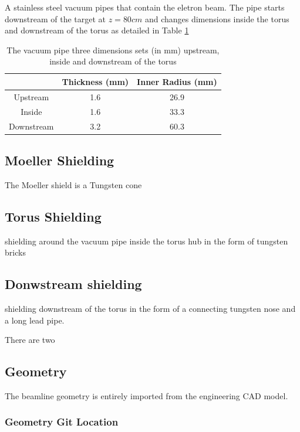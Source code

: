 A stainless steel vacuum pipes that contain the eletron beam. The pipe starts downstream of the target at $z=80cm$
and changes dimensions inside the torus and downstream of the torus as detailed in Table \ref{tab:beampipe}

\begin{table}[h]
	\begin{center}
		\begin{tabular}{| c | c | c |}
			\hline \hline
			                & Thickness (mm) & Inner Radius (mm)   \\
			\hline
              Upstream      &    1.6     &    26.9 \\
              Inside        &    1.6     &    33.3 \\
            Downstream      &    3.2     &    60.3 \\
			\hline \hline
		\end{tabular}
	\end{center}
	\caption{The vacuum pipe three dimensions sets (in mm) upstream, inside and downstream of the torus}\label{tab:beampipe}
\end{table}


\subsection{Moeller Shielding}
The Moeller shield is a Tungsten cone


\subsection{Torus Shielding}
shielding around the vacuum pipe inside the torus hub in the form of tungsten bricks

\subsection{Donwstream shielding}
shielding downstream of the torus in the form of a connecting tungsten nose and a long lead pipe.


There are two

\subsection{Geometry}

The beamline geometry is entirely imported from the engineering CAD model.


\subsubsection{Geometry Git Location}


